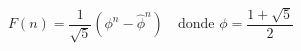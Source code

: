 \[
F(n) = \frac{1}{\sqrt{5}} \left( \phi^n - \hat{\phi}^n \right)
\quad \text{donde } \phi = \frac{1 + \sqrt{5}}{2}
\]
